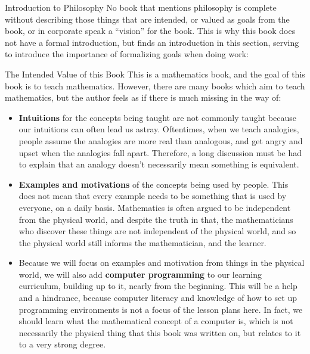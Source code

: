 \begin{chapter}{Introduction to Philosophy}
    No book that mentions philosophy is complete without describing those things that are intended, or valued as goals from the book, or in corporate speak a ``vision'' for the book. This is why this book does not have a formal introduction, but finds an introduction in this section, serving to introduce the importance of formalizing goals when doing work:
        
    \begin{section}{The Intended Value of this Book}
        This is a mathematics book, and the goal of this book is to teach mathematics. However, there are many books which aim to teach mathematics, but the author feels as if there is much missing in the way of:
            
        \begin{itemize}
            \setlength{\itemsep}{6pt}
            \setlength{\parskip}{12pt}
                
            \item \textbf{Intuitions} for the concepts being taught are not commonly taught because our intuitions can often lead us astray. Oftentimes, when we teach analogies, people assume the analogies are more real than analogous, and get angry and upset when the analogies fall apart. Therefore, a long discussion must be had to explain that an analogy doesn't necessarily mean something is equivalent.
     
            \item \textbf{Examples and motivations} of the concepts being used by people. This does not mean that every example needs to be something that is used by everyone, on a daily basis. Mathematics is often argued to be independent from the physical world, and despite the truth in that, the mathematicians who discover these things are not independent of the physical world, and so the physical world still informs the mathematician, and the learner.
               
            \item Because we will focus on examples and motivation from things in the physical world, we will also add \textbf{computer programming} to our learning curriculum, building up to it, nearly from the beginning. This will be a help and a hindrance, because computer literacy and knowledge of how to set up programming environments is not a focus of the lesson plans here. In fact, we should learn what the mathematical concept of a computer is, which is not necessarily the physical thing that this book was written on, but relates to it to a very strong degree.
                

\end{itemize}
\end{section}
\end{chapter}
